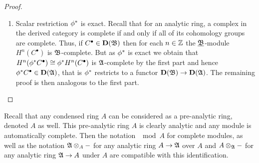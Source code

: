 \begin{proof}
\begin{enumerate}
$$\begin{tikzcd}
			\mod{\preAnaRing{B}} &\mod{\preAnaRing{A}}\ar[l, "\completedScalarExtension{\phi}{\preAnaRing{B}}", swap]\\
			\mod{\underlying{B}}\ar[ur, Rightarrow, "\sim" {sloped, near start}]\ar[u, "{\completion{-}{\preAnaRing{B}} = \preAnaRing{B}\otimes_\underlying{B} -}"] &\mod{\underlying{A}}\ar[l, "\scalarExtension{\phi}"]\ar[u, "{\completion{-}{\preAnaRing{A}} = \preAnaRing{A}\otimes_\underlying{A} -}", swap].
		\end{tikzcd}$$
		of left adjoints must commute up to unique isomorphism as well, as the composition of two left adjoints is a left adjoint of the composition of the original functors. In particular,
			$$\completedScalarExtension{\phi}{\preAnaRing{B}}\pfree{A}{S} \cong  \completedScalarExtension{\phi}{\preAnaRing{B}}\completion{\ufree{A}{S}}{\preAnaRing{A}} \cong \completion{\scalarExtension{\phi}\ufree{A}{S}}{\preAnaRing{B}} = \completionAsTensor{\preAnaRing{B}}{\underlying{B}}{\underlying{B}\otimes_\underlying{A}\ufree{A}{S}} \cong \completionAsTensor{\preAnaRing{B}}{\underlying{B}}{\ufree{B}{S}} \cong \pfree{B}{S}$$
		so $\completedScalarExtension{\phi}{\preAnaRing{B}}$ is the unique colimit preserving extension of $\pfree{A}{S} \mapsto \pfree{B}{S}$ as claimed.
		
		\item 
		Scalar restriction ${\phi^\ast}$ is exact. Recall that for an analytic ring, a complex in the derived category is complete if and only if all of its cohomology groups are complete. Thus, if $C^\bullet\in{{\mathbf{D}}({\mathfrak{B}})}$ then for each $n\in {\mathbb{Z}}$ the ${\underline{{\mathfrak{B}}}}$-module $H^n(C^\bullet)$ is ${\mathfrak{B}}$-complete. But as ${\phi^\ast}$ is exact we obtain that $H^n({\phi^\ast}C^\bullet) \cong {\phi^\ast}H^n(C^\bullet)$ is ${\mathfrak{A}}$-complete by the first part and hence ${\phi^\ast}C^\bullet \in {{\mathbf{D}}({\mathfrak{A}})}$, that is ${\phi^\ast}$ restricts to a functor ${{\mathbf{D}}({\mathfrak{B}})}\to{{\mathbf{D}}({\mathfrak{A}})}$. The remaining proof is then analogous to the first part.
	\end{enumerate}
\end{proof}

\begin{remark}
	Recall that any condensed ring $A$ can be considered as a pre-analytic ring, denoted $A$ as well. This pre-analytic ring $A$ is clearly analytic and any module is automatically complete. Then the notation $\mod{A}$ for complete modules, as well as the notation ${\mathfrak{A}}\otimes_{A} -$ for any analytic ring $A\to {\mathfrak{A}}$ over $A$ and $A\otimes_{\mathfrak{A}}-$ for any analytic ring ${\mathfrak{A}}\to A$ under $A$ are compatible with this identification.
\end{remark}

